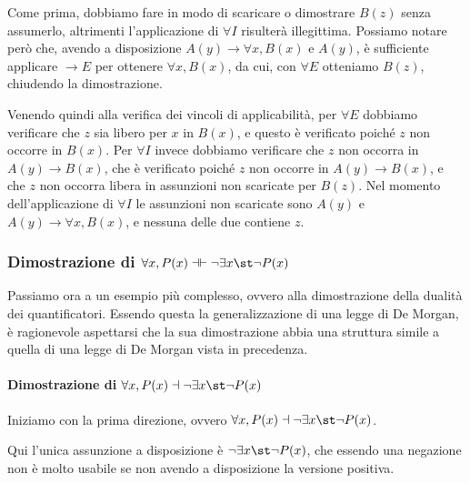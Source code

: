 Come prima, dobbiamo fare in modo di scaricare o dimostrare \(B(z)\) senza assumerlo, altrimenti l'applicazione di \(\forall I\) risulterà illegittima. Possiamo notare però che, avendo a disposizione \(A(y) \to \forall x, B(x)\) e \(A(y)\), è sufficiente applicare \(\to E\) per ottenere \(\forall x, B(x)\), da cui, con \(\forall E\) otteniamo \(B(z)\), chiudendo la dimostrazione.

\begin{prooftree}
\end{prooftree}

Venendo quindi alla verifica dei vincoli di applicabilità, per \(\forall E\) dobbiamo verificare che \(z\) sia libero per \(x\) in \(B(x)\), e questo è verificato poiché \(z\) non occorre in \(B(x)\). Per \(\forall I\) invece dobbiamo verificare che \(z\) non occorra in \(A(y)\to B(x)\), che è verificato poiché \(z\) non occorre in \(A(y)\to B(x)\), e che \(z\) non occorra libera in assunzioni non scaricate per \(B(z)\). Nel momento dell'applicazione di \(\forall I\) le assunzioni non scaricate sono \(A(y)\) e \(A(y) \to \forall x, B(x)\), e nessuna delle due contiene \(z\).

\subsubsection*{Dimostrazione di \(\forall x, P(x) \dashv \vdash \neg \exists x\st \neg P(x)\)}

Passiamo ora a un esempio più complesso, ovvero alla dimostrazione della dualità dei quantificatori. Essendo questa la generalizzazione di una legge di De Morgan, è ragionevole aspettarsi che la sua dimostrazione abbia una struttura simile a quella di una legge di De Morgan vista in precedenza.

\paragraph{Dimostrazione di \(\forall x, P(x) \dashv \neg \exists x\st \neg P(x)\)}

Iniziamo con la prima direzione, ovvero \(\forall x, P(x) \dashv \neg \exists x\st \neg P(x)\).

Qui l'unica assunzione a disposizione è \(\neg \exists x\st \neg P(x)\), che essendo una negazione non è molto usabile se non avendo a disposizione la versione positiva.

